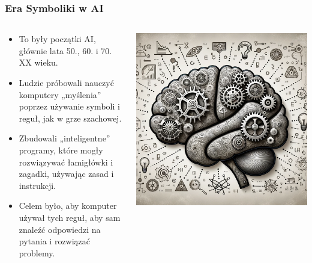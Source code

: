 \documentclass[smaller]{beamer}
\begin{document}

\begin{frame}
\frametitle{Era Symboliki w AI}

\begin{columns}
    \begin{column}{0.6\textwidth}
        \begin{itemize}
            \item To były początki AI, głównie lata 50., 60. i 70. XX wieku.
            \item Ludzie próbowali nauczyć komputery „myślenia” poprzez używanie symboli i reguł, jak w grze szachowej.
            \item Zbudowali „inteligentne” programy, które mogły rozwiązywać łamigłówki i zagadki, używając zasad i instrukcji.
            \item Celem było, aby komputer używał tych reguł, aby sam znaleźć odpowiedzi na pytania i rozwiązać problemy.
        \end{itemize}
    \end{column}

    \begin{column}{0.4\textwidth}
        \includegraphics[width=\textwidth]{../manifest/gofai.png} %
    \end{column}
\end{columns}
\end{frame}
\end{document}

